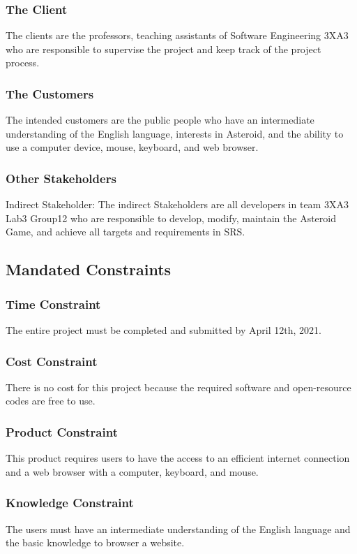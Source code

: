 \documentclass[12pt, titlepage]{article}
\begin{document}
\subsubsection{The Client}
The clients are the professors, teaching assistants of Software Engineering 3XA3 who are responsible to supervise the project and keep track of the project process. 
\subsubsection{The Customers}
The intended customers are the public people who have an intermediate understanding of the English language, interests in Asteroid, and the ability to use a computer device, mouse, keyboard, and web browser. 
\subsubsection{Other Stakeholders}
Indirect Stakeholder: The indirect Stakeholders are all developers in team 3XA3 Lab3 Group12 who are responsible to develop, modify, maintain the Asteroid Game, and achieve all targets and requirements in SRS.  
\subsection{Mandated Constraints}
\subsubsection{Time Constraint}
The entire project must be completed and submitted by April 12th, 2021. 
\subsubsection{Cost Constraint}
There is no cost for this project because the required software and open-resource codes are free to use. 
\subsubsection{Product Constraint}
This product requires users to have the access to an efficient internet connection and a web browser with a computer, keyboard, and mouse.
\subsubsection{Knowledge Constraint}
The users must have an intermediate understanding of the English language and the basic knowledge to browser a website.
\end{document}
